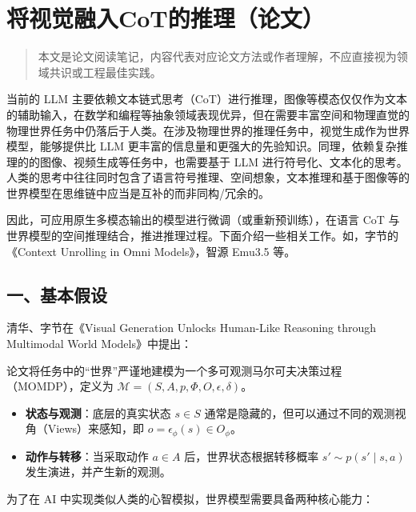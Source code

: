 \clearpage

\hypertarget{ux5c06ux89c6ux89c9ux878dux5165cotux7684ux63a8ux7406ux8bbaux6587}{%
\section{将视觉融入CoT的推理（论文）}\label{ux5c06ux89c6ux89c9ux878dux5165cotux7684ux63a8ux7406ux8bbaux6587}}

\begin{quote}
本文是论文阅读笔记，内容代表对应论文方法或作者理解，不应直接视为领域共识或工程最佳实践。
\end{quote}

当前的 LLM 主要依赖文本链式思考（CoT）进行推理，图像等模态仅仅作为文本的辅助输入，在数学和编程等抽象领域表现优异，但在需要丰富空间和物理直觉的物理世界任务中仍落后于人类。在涉及物理世界的推理任务中，视觉生成作为世界模型，能够提供比 LLM 更丰富的信息量和更强大的先验知识。同理，依赖复杂推理的的图像、视频生成等任务中，也需要基于 LLM 进行符号化、文本化的思考。人类的思考中往往同时包含了语言符号推理、空间想象，文本推理和基于图像等的世界模型在思维链中应当是互补的而非同构/冗余的。

因此，可应用原生多模态输出的模型进行微调（或重新预训练），在语言 CoT 与世界模型的空间推理结合，推进推理过程。下面介绍一些相关工作。如，字节的《Context Unrolling in Omni Models》，智源 Emu3.5 等。

\hypertarget{ux4e00ux57faux672cux5047ux8bbe}{%
\subsection{一、基本假设}\label{ux4e00ux57faux672cux5047ux8bbe}}

清华、字节在《Visual Generation Unlocks Human-Like Reasoning through Multimodal World Models》中提出：

论文将任务中的``世界''严谨地建模为一个多可观测马尔可夫决策过程（MOMDP），定义为 \(\mathcal{M}=(S,A,p,\Phi,O,\epsilon,\delta)\)。

\begin{itemize}
\tightlist
\item
  \textbf{状态与观测}：底层的真实状态 \(s\in S\) 通常是隐藏的，但可以通过不同的观测视角（Views）来感知，即 \(o=\epsilon_{\phi}(s)\in O_{\phi}\)。
\item
  \textbf{动作与转移}：当采取动作 \(a\in A\) 后，世界状态根据转移概率 \(s'\sim p(s'\mid s,a)\) 发生演进，并产生新的观测。
\end{itemize}

为了在 AI 中实现类似人类的心智模拟，世界模型需要具备两种核心能力：


